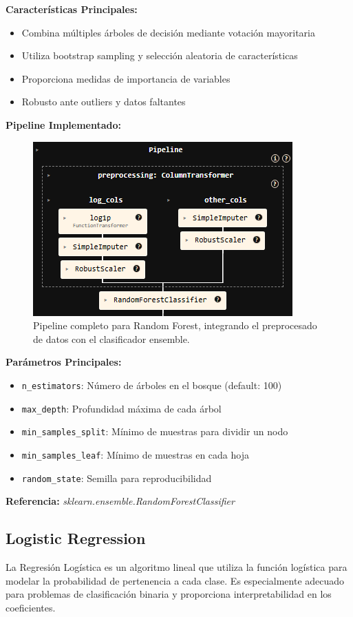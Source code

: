 \documentclass{article}
\begin{document}
\textbf{Características Principales:}
\begin{itemize}
    \item Combina múltiples árboles de decisión mediante votación mayoritaria
    \item Utiliza bootstrap sampling y selección aleatoria de características
    \item Proporciona medidas de importancia de variables
    \item Robusto ante outliers y datos faltantes
\end{itemize}

\textbf{Pipeline Implementado:}
\begin{figure}[H]
    \centering
    \includegraphics[width=0.4\linewidth]{pipeline_random_forest.png}
    \caption{Pipeline completo para Random Forest, integrando el preprocesado de datos con el clasificador ensemble.}
    \label{fig:pipeline_rf}
\end{figure}

\textbf{Parámetros Principales:}
\begin{itemize}
    \item \texttt{n\_estimators}: Número de árboles en el bosque (default: 100)
    \item \texttt{max\_depth}: Profundidad máxima de cada árbol
    \item \texttt{min\_samples\_split}: Mínimo de muestras para dividir un nodo
    \item \texttt{min\_samples\_leaf}: Mínimo de muestras en cada hoja
    \item \texttt{random\_state}: Semilla para reproducibilidad
\end{itemize}

\textbf{Referencia:} \textit{sklearn.ensemble.RandomForestClassifier} \cite{sklearn_rf}

\subsection{Logistic Regression}

La Regresión Logística es un algoritmo lineal que utiliza la función logística para modelar la probabilidad de pertenencia a cada clase. Es especialmente adecuado para problemas de clasificación binaria y proporciona interpretabilidad en los coeficientes.
\end{document}
